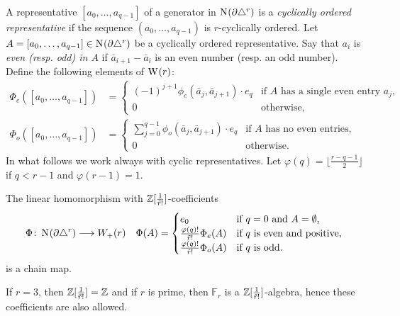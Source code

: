 A representative $[a_0,\dots,a_{q-1}]$ of a generator in $\operatorname{N}_{}(\partial \triangle^{r})$ is a \emph{cyclically ordered representative} if the sequence $(a_0,\dots,a_{q-1})$ is $r$-cyclically ordered. Let $A=[a_0,\dots,a_{q-1}]\in \operatorname{N}_{}(\partial \triangle^{r})$ be a cyclically ordered representative. Say that $a_i$ is \emph{even \emph{(resp. \emph{odd})} in $A$} if $\bar{a}_{i+1}-\bar{a}_i$ is an even number (resp. an odd number). 
Define the following elements of $\operatorname{W}_{}(r)$:
\begin{align*}
	\Phi_e([a_0,\dots,a_{q-1}]) &= \begin{cases}
		(-1)^{j+1}\phi_e(\bar{a}_j,\bar{a}_{j+1})\cdot e_q & \text{if $A$ has a single even entry $a_j$,} \\
		0 & \text{otherwise,}
	\end{cases}
	\\
	\Phi_o([a_0,\dots,a_{q-1}]) &= \begin{cases}
		\sum_{j=0}^{q-1} \phi_o(\bar{a}_j,\bar{a}_{j+1})\cdot e_q & \text{if $A$ has no even entries,} \\
		0 & \text{otherwise.}
	\end{cases}
\end{align*} 
In what follows we work always with cyclic representatives. Let $\varphi(q) = \lfloor\frac{r-q-1}{2}\rfloor$ if $q<r-1$ and $\varphi(r-1) =1$.

\begin{proposition}\label{prop:chains_to_minimal} The linear homomorphism with $\mathbb{Z}[\frac{1}{\tilde{r}!}]$-coefficients
	\begin{align*}
		\Phi \colon \operatorname{N}_{}(\partial \triangle^{r})& \longrightarrow W_+(r)
		&
		\Phi(A) = \begin{cases}
			e_0 & \text{if $q=0$ and $A = \emptyset$,}\\
			\frac{\varphi(q)!}{\tilde{r}!}\Phi_e(A) & \text{if $q$ is even and positive,} \\
			\frac{\varphi(q)!}{\tilde{r}!}\Phi_o(A) & \text{if $q$ is odd.}
		\end{cases}
	\end{align*}
	is a chain map.
\end{proposition}

\begin{remark}
	If $r=3$, then $\mathbb{Z}[\frac{1}{\tilde{r}!}] = \mathbb{Z}$ and if $r$ is prime, then $\mathbb{F}_r$ is a $\mathbb{Z}[\frac{1}{\tilde{r}!}]$-algebra, hence these coefficients are also allowed.
\end{remark}

